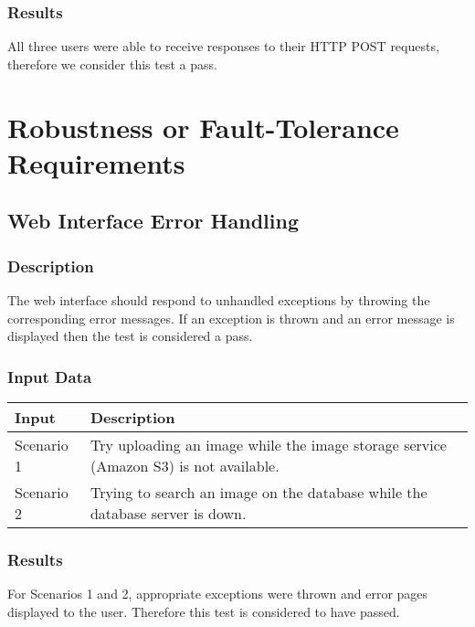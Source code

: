 \documentclass{scrreprt}
\begin{document}
\subsubsection{Results}

All three users were able to receive responses to their HTTP POST requests,
therefore we consider this test a pass.

\section{Robustness or Fault-Tolerance Requirements}
\subsection{Web Interface Error Handling}
\subsubsection{Description}

The web interface should respond to unhandled exceptions by throwing the
corresponding error messages. If an exception is thrown and an error message is
displayed then the test is considered a pass.

\subsubsection{Input Data}

\begin{table}[H]
        \centering
        \begin{tabular}{p{3cm}p{6cm}}
                \hline\hline
                Input & Description\\
                \hline\hline
                Scenario 1 &  Try uploading an image while the image storage service (Amazon S3) is not available. \\
                \hline
                Scenario 2 & Trying to search an image on the database while the database server is down.
        \end{tabular}
\end{table}

\subsubsection{Results}

For Scenarios 1 and 2, appropriate exceptions were thrown and error pages
displayed to the user. Therefore this test is considered to have passed.
\end{document}
